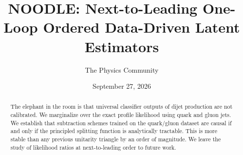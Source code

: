 \documentclass[11pt]{article}
\title{NOODLE: Next-to-Leading One-Loop Ordered Data-Driven Latent Estimators}
\author{The Physics Community}
\date{September 27, 2026}
\begin{document}
\maketitle
\begin{abstract}
The elephant in the room is that universal classifier outputs of dijet
production are not calibrated. We marginalize over the exact profile
likelihood using quark and gluon jets. We establish that subtraction
schemes trained on the quark/gluon dataset are causal if and only if the
principled splitting function is analytically tractable. This is more
stable than any previous unitarity triangle by an order of magnitude. We
leave the study of likelihood ratios at next-to-leading order to future
work.
\end{abstract}
\tableofcontents




\nocite{*}


\end{document}
